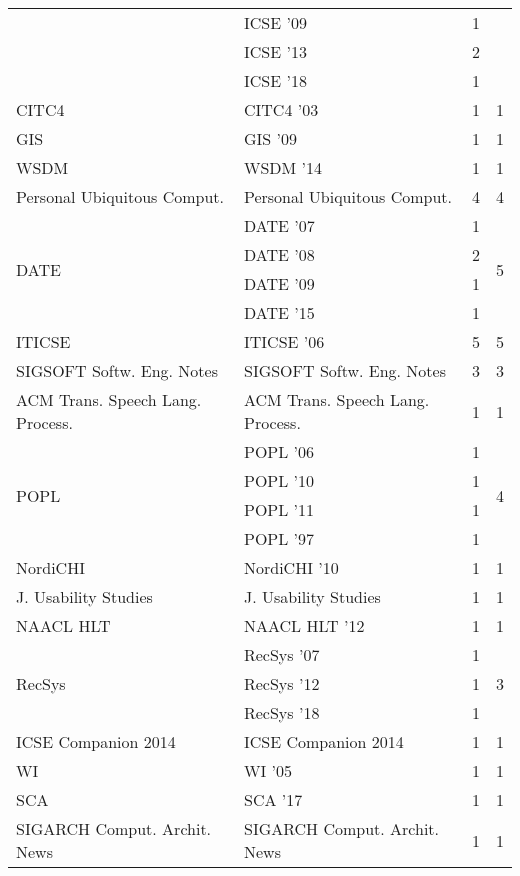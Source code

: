 \begin{table*}[t]
\begin{tabular}{llrr}
& ICSE '09 & 1 &\\
& ICSE '13 & 2 &\\
& ICSE '18 & 1 &\\
\multirow{1}{*}{CITC4 } & CITC4 '03 & 1 & \multirow{1}{*}{1}\\
\multirow{1}{*}{GIS } & GIS '09 & 1 & \multirow{1}{*}{1}\\
\multirow{1}{*}{WSDM } & WSDM '14 & 1 & \multirow{1}{*}{1}\\
\multirow{1}{*}{Personal Ubiquitous Comput.} & Personal Ubiquitous Comput. & 4 & \multirow{1}{*}{4}\\
\multirow{4}{*}{DATE } & DATE '07 & 1 & \multirow{4}{*}{5}\\
& DATE '08 & 2 &\\
& DATE '09 & 1 &\\
& DATE '15 & 1 &\\
\multirow{1}{*}{ITICSE } & ITICSE '06 & 5 & \multirow{1}{*}{5}\\
\multirow{1}{*}{SIGSOFT Softw. Eng. Notes} & SIGSOFT Softw. Eng. Notes & 3 & \multirow{1}{*}{3}\\
\multirow{1}{*}{ACM Trans. Speech Lang. Process.} & ACM Trans. Speech Lang. Process. & 1 & \multirow{1}{*}{1}\\
\multirow{4}{*}{POPL } & POPL '06 & 1 & \multirow{4}{*}{4}\\
& POPL '10 & 1 &\\
& POPL '11 & 1 &\\
& POPL '97 & 1 &\\
\multirow{1}{*}{NordiCHI } & NordiCHI '10 & 1 & \multirow{1}{*}{1}\\
\multirow{1}{*}{J. Usability Studies} & J. Usability Studies & 1 & \multirow{1}{*}{1}\\
\multirow{1}{*}{NAACL HLT } & NAACL HLT '12 & 1 & \multirow{1}{*}{1}\\
\multirow{3}{*}{RecSys } & RecSys '07 & 1 & \multirow{3}{*}{3}\\
& RecSys '12 & 1 &\\
& RecSys '18 & 1 &\\
\multirow{1}{*}{ICSE Companion 2014} & ICSE Companion 2014 & 1 & \multirow{1}{*}{1}\\
\multirow{1}{*}{WI } & WI '05 & 1 & \multirow{1}{*}{1}\\
\multirow{1}{*}{SCA } & SCA '17 & 1 & \multirow{1}{*}{1}\\
\multirow{1}{*}{SIGARCH Comput. Archit. News} & SIGARCH Comput. Archit. News & 1 & \multirow{1}{*}{1}\\

\end{tabular}
\end{table*}

